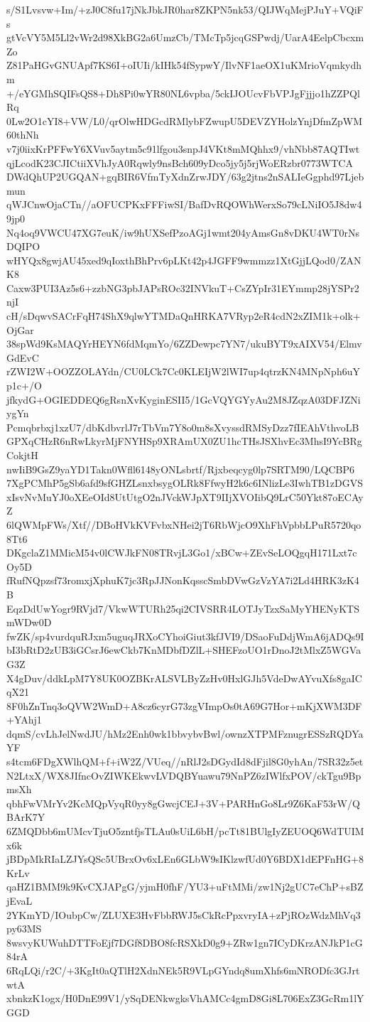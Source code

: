 s/S1Lvsvw+Im/+zJ0C8fu17jNkJbkJR0har8ZKPN5nk53/QIJWqMejPJuY+VQiFs
gtVcVY5M5Ll2vWr2d98XkBG2a6UmzCb/TMcTp5jcqGSPwdj/UarA4EelpCbcxmZo
Z81PaHGvGNUApf7KS6I+oIUIi/kIHk54fSypwY/IlvNF1aeOX1uKMrioVqmkydhm
+/eYGMhSQIFsQS8+Dh8Pi0wYR80NL6vpba/5ckIJOUcvFbVPJgFjjjo1hZZPQlRq
0Lw2O1cYI8+VW/L0/qrOlwHDGcdRMlybFZwupU5DEVZYHolzYnjDfmZpWM60thNh
v7j0iixKrPFFwY6XVuv5aytm5c91lfgou3snpJ4VKt8mMQhhx9/vhNbb87AQTIwt
qjLcodK23CJICtiiXVhJyA0Rqwly9nsBch609yDco5jy5j5rjWoERzbr0773WTCA
DWdQhUP2UGQAN+gqBIR6VfmTyXdnZrwJDY/63g2jtns2nSALIeGgphd97Ljebmun
qWJCnwOjaCTn//aOFUCPKxFFFiwSI/BafDvRQOWhWerxSo79cLNiIO5J8dw49jp0
Nq4oq9VWCU47XG7euK/iw9hUXSefPzoAGj1wmt204yAmsGn8vDKU4WT0rNsDQIPO
wHYQx8gwjAU45xed9qIoxthBhPrv6pLKt42p4JGFF9wmmzz1XtGjjLQod0/ZANK8
Caxw3PUI3Az5s6+zzbNG3pbJAPsROc32INVkuT+CsZYpIr31EYmmp28jYSPr2njI
cH/sDqwvSACrFqH74ShX9qlwYTMDaQnHRKA7VRyp2eR4cdN2xZIM1k+olk+OjGar
38spWd9KsMAQYrHEYN6fdMqmYo/6ZZDewpc7YN7/ukuBYT9xAIXV54/ElmvGdEvC
rZWI2W+OOZZOLAYdn/CU0LCk7Cc0KLEIjW2lWI7up4qtrzKN4MNpNph6uYp1c+/O
jfkydG+OGIEDDEQ6gRsnXvKyginESII5/1GcVQYGYyAu2M8JZqzA03DFJZNiygYn
Pcmqbrbxj1xzU7/dbKdbvrlJ7rTbVm7Y8o0m8sXvyssdRMSyDzz7fIEAhVthvoLB
GPXqCHzR6nRwLkyrMjFNYHSp9XRAmUX0ZU1hcTHsJSXhvEc3MhsI9YcBRgCokjtH
nwIiB9GsZ9yaYD1Takn0Wfll6148yONLsbrtf/Rjxbeqcyg0lp7SRTM90/LQCBP6
7XgPCMhP5gSb6afd9sfGHZLsnxbsygOLRk8FfwyH2k6c6INlizLe3IwhTB1zDGVS
xIsvNvMuYJ0oXEeOId8UtUtgO2nJVckWJpXT9IIjXVOIibQ9LrC50Ykt87oECAyZ
6lQWMpFWs/Xtf//DBoHVkKVFvbxNHei2jT6RbWjcO9XhFhVpbbLPuR5720qo8Tt6
DKgclaZ1MMicM54v0lCWJkFN08TRvjL3Go1/xBCw+ZEvSeLOQgqH171Lxt7cOy5D
fRufNQpzsf73romxjXphuK7jc3RpJJNonKqsscSmbDVwGzVzYA7i2Ld4HRK3zK4B
EqzDdUwYogr9RVjd7/VkwWTURh25qi2CIVSRR4LOTJyTzxSaMyYHENyKTSmWDw0D
fwZK/sp4vurdquRJxm5uguqJRXoCYhoiGiut3kfJVI9/DSaoFuDdjWmA6jADQs9I
bI3bRtD2zUB3iGCsrJ6ewCkb7KnMDbfDZlL+SHEFzoUO1rDnoJ2tMlxZ5WGVaG3Z
X4gDuv/ddkLpM7Y8UK0OZBKrALSVLByZzHv0HxlGJh5VdeDwAYvuXfs8gaICqX21
8F0hZnTnq3oQVW2WmD+A8cz6cyrG73zgVImpOs0tA69G7Hor+mKjXWM3DF+YAhj1
dqmS/cvLhJelNwdJU/hMz2Enh0wk1bbvybvBwl/ownzXTPMFznugrESSzRQDYaYF
s4tcm6FDgXWlhQM+f+iW2Z/VUeq//nRlJ2sDGydId8dFjil8G0yhAn/7SR32z5et
N2LtxX/WX8JIfncOvZIWKEkwvLVDQBYuawu79NnPZ6zIWlfxPOV/ckTgu9BpmsXh
qbhFwVMrYv2KcMQpVyqR0yy8gGwcjCEJ+3V+PARHnGo8Lr9Z6KaF53rW/QBArK7Y
6ZMQDbb6mUMcvTjuO5zntfjsTLAu0sUiL6bH/pcTt81BUlgIyZEUOQ6WdTUIMx6k
jBDpMkRIaLZJYsQSc5UBrxOv6xLEn6GLbW9sIKlzwfUd0Y6BDX1dEPFnHG+8KrLv
qaHZ1BMM9k9KvCXJAPgG/yjmH0fhF/YU3+uFtMMi/zw1Nj2gUC7eChP+sBZjEvaL
2YKmYD/IOubpCw/ZLUXE3HvFbbRWJ5sCkRcPpxvryIA+zPjROzWdzMhVq3py63MS
8wsvyKUWuhDTTFoEjf7DGf8DBO8fcRSXkD0g9+ZRw1gn7ICyDKrzANJkP1cG84rA
6RqLQi/r2C/+3KgIt0aQTlH2XdnNEk5R9VLpGYndq8umXhfs6mNRODfc3GJrtwtA
xbnkzK1ogx/H0DnE99V1/ySqDENkwgksVhAMCc4gmD8Gi8L706ExZ3GcRm1lYGGD
